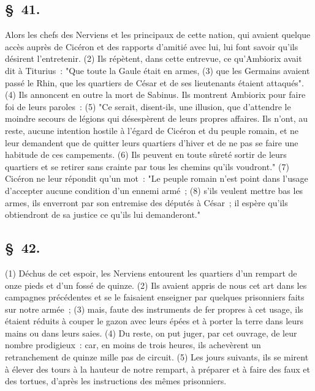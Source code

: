 \documentclass[french,twoside]{book} %
\begin{document}
\subsection[{§ 41.}]{ \textsc{§ 41.} }
\noindent Alors les chefs des Nerviens et les principaux de cette nation, qui avaient quelque accès auprès de Cicéron et des rapports d’amitié avec lui, lui font savoir qu’ils désirent l’entretenir. (2) Ils répètent, dans cette entrevue, ce qu’Ambiorix avait dit à Titurius : "Que toute la Gaule était en armes, (3) que les Germains avaient passé le Rhin, que les quartiers de César et de ses lieutenants étaient attaqués". (4) Ils annoncent en outre la mort de Sabinus. Ils montrent Ambiorix pour faire foi de leurs paroles : (5) "Ce serait, disent-ils, une illusion, que d’attendre le moindre secours de légions qui désespèrent de leurs propres affaires. Ils n’ont, au reste, aucune intention hostile à l’égard de Cicéron et du peuple romain, et ne leur demandent que de quitter leurs quartiers d’hiver et de ne pas se faire une habitude de ces campements. (6) Ils peuvent en toute sûreté sortir de leurs quartiers et se retirer sans crainte par tous les chemins qu’ils voudront." (7) Cicéron ne leur répondit qu’un mot : "Le peuple romain n’est point dans l’usage d’accepter aucune condition d’un ennemi armé ; (8) s’ils veulent mettre bas les armes, ils enverront par son entremise des députés à César ; il espère qu’ils obtiendront de sa justice ce qu’ils lui demanderont."
\subsection[{§ 42.}]{ \textsc{§ 42.} }
\noindent (1) Déchus de cet espoir, les Nerviens entourent les quartiers d’un rempart de onze pieds et d’un fossé de quinze. (2) Ils avaient appris de nous cet art dans les campagnes précédentes et se le faisaient enseigner par quelques prisonniers faits sur notre armée ; (3) mais, faute des instruments de fer propres à cet usage, ils étaient réduits à couper le gazon avec leurs épées et à porter la terre dans leurs mains ou dans leurs saies. (4) Du reste, on put juger, par cet ouvrage, de leur nombre prodigieux : car, en moins de trois heures, ils achevèrent un retranchement de quinze mille pas de circuit. (5) Les jours suivants, ils se mirent à élever des tours à la hauteur de notre rempart, à préparer et à faire des faux et des tortues, d’après les instructions des mêmes prisonniers.
\end{document}
